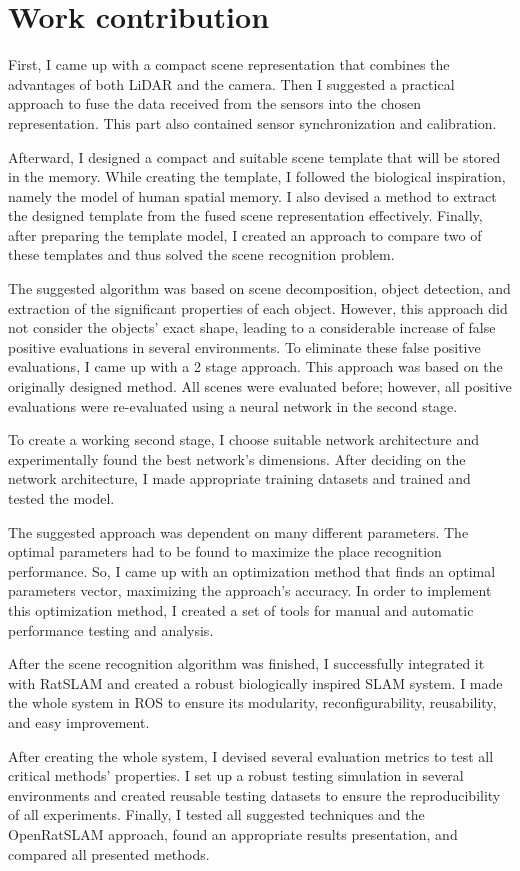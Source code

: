 \section{Work contribution}\label{section:workContribution}

First, I came up with a compact scene representation that combines the advantages of both LiDAR and the camera. Then I suggested a practical approach to fuse the data received from the sensors into the chosen representation. This part also contained sensor synchronization and calibration.\par
Afterward, I designed a compact and suitable scene template that will be stored in the memory. While creating the template, I followed the biological inspiration, namely the model of human spatial memory. I also devised a method to extract the designed template from the fused scene representation effectively. Finally, after preparing the template model, I created an approach to compare two of these templates and thus solved the scene recognition problem.\par
The suggested algorithm was based on scene decomposition, object detection, and extraction of the significant properties of each object. However, this approach did not consider the objects' exact shape, leading to a considerable increase of false positive evaluations in several environments. To eliminate these false positive evaluations, I came up with a 2 stage approach. This approach was based on the originally designed method. All scenes were evaluated before; however, all positive evaluations were re-evaluated using a neural network in the second stage.\par
To create a working second stage, I choose suitable network architecture and experimentally found the best network's dimensions. After deciding on the network architecture, I made appropriate training datasets and trained and tested the model.\par
The suggested approach was dependent on many different parameters. The optimal parameters had to be found to maximize the place recognition performance. So, I came up with an optimization method that finds an optimal parameters vector, maximizing the approach's accuracy. In order to implement this optimization method, I created a set of tools for manual and automatic performance testing and analysis.\par
After the scene recognition algorithm was finished, I successfully integrated it with RatSLAM and created a robust biologically inspired SLAM system. I made the whole system in ROS to ensure its modularity, reconfigurability, reusability, and easy improvement.\par
After creating the whole system, I devised several evaluation metrics to test all critical methods' properties. I set up a robust testing simulation in several environments and created reusable testing datasets to ensure the reproducibility of all experiments. Finally, I tested all suggested techniques and the OpenRatSLAM approach, found an appropriate results presentation, and compared all presented methods.

